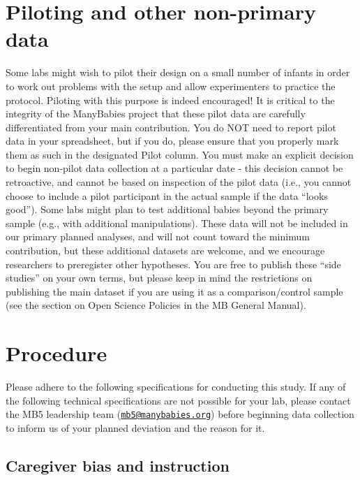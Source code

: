 \documentclass[
]{book}
\begin{document}
\hypertarget{piloting-and-other-non-primary-data}{%
\section{Piloting and other non-primary data}\label{piloting-and-other-non-primary-data}}

Some labs might wish to pilot their design on a small number of infants in order to work out problems with the setup and allow experimenters to practice the protocol. Piloting with this purpose is indeed encouraged!
It is critical to the integrity of the ManyBabies project that these pilot data are carefully differentiated from your main contribution. You do NOT need to report pilot data in your spreadsheet, but if you do, please ensure that you properly mark them as such in the designated Pilot column.
You must make an explicit decision to begin non-pilot data collection at a particular date - this decision cannot be retroactive, and cannot be based on inspection of the pilot data (i.e., you cannot choose to include a pilot participant in the actual sample if the data ``looks good'').
Some labs might plan to test additional babies beyond the primary sample (e.g., with additional manipulations). These data will not be included in our primary planned analyses, and will not count toward the minimum contribution, but these additional datasets are welcome, and we encourage researchers to preregister other hypotheses. You are free to publish these ``side studies'' on your own terms, but please keep in mind the restrictions on publishing the main dataset if you are using it as a comparison/control sample (see the section on Open Science Policies in the MB General Manual).

\hypertarget{procedure}{%
\section{Procedure}\label{procedure}}

Please adhere to the following specifications for conducting this study. If any of the following technical specifications are not possible for your lab, please contact the MB5 leadership team (\href{mailto:mb5@manybabies.org}{\nolinkurl{mb5@manybabies.org}}) before beginning data collection to inform us of your planned deviation and the reason for it.

\hypertarget{caregiver-bias-and-instruction}{%
\subsection{Caregiver bias and instruction}\label{caregiver-bias-and-instruction}}
\end{document}
